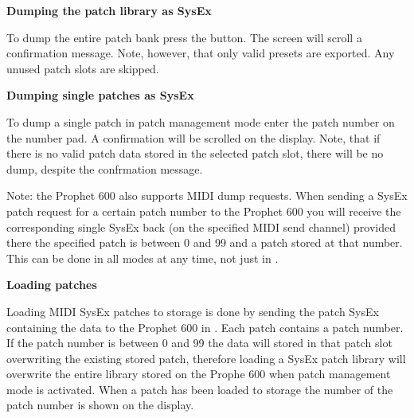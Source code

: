 {
}


\textbf{Dumping the patch library as SysEx} 

To dump the entire patch bank press the \preset button. The screen will scroll a confirmation message. Note, however, that only valid presets are exported. Any unused patch slots are skipped.

\textbf{Dumping single patches as SysEx} 

To dump a single patch in patch management mode enter the patch number on the number pad. A confirmation will be scrolled on the display. Note, that if there is no valid patch data stored in the selected patch slot, there will be no dump, despite the confrmation message.

Note: the Prophet 600 also supports MIDI dump requests. When sending a SysEx patch request for a certain patch number to the Prophet 600 you will receive the corresponding single SysEx back (on the specified MIDI send channel) provided there the specified patch is between 0 and 99 and a patch stored at that number. This can be done in all modes at any time, not just in \patchmgmt.

\textbf{Loading patches} 

Loading MIDI SysEx patches to storage is done by sending the patch SysEx containing the data to the Prophet 600 in \patchmgmt. Each patch contains a patch number. If the patch number is  between 0 and 99 the data will stored in that patch slot overwriting the existing stored patch, therefore loading a SysEx patch library will overwrite the entire library stored on the Prophe 600 when patch management mode is activated. When a patch has been loaded to storage the number of the patch number is shown on the display.

